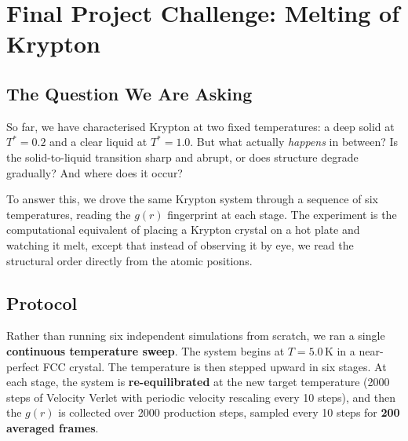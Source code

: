 %
%
\section{Final Project Challenge: Melting of Krypton}

\subsection{The Question We Are Asking}

So far, we have characterised Krypton at two fixed temperatures: a deep solid at $T^* = 0.2$ and a clear liquid at $T^* = 1.0$. But what actually \emph{happens} in between? Is the solid-to-liquid transition sharp and abrupt, or does structure degrade gradually? And where does it occur?

To answer this, we drove the same Krypton system through a sequence of six temperatures, reading the $g(r)$ fingerprint at each stage. The experiment is the computational equivalent of placing a Krypton crystal on a hot plate and watching it melt, except that instead of observing it by eye, we read the structural order directly from the atomic positions.

\subsection{Protocol}

Rather than running six independent simulations from scratch, we ran a single \textbf{continuous temperature sweep}. The system begins at $T = 5.0$\,K in a near-perfect FCC crystal. The temperature is then stepped upward in six stages. At each stage, the system is \textbf{re-equilibrated} at the new target temperature (2000 steps of Velocity Verlet with periodic velocity rescaling every 10 steps), and then the $g(r)$ is collected over 2000 production steps, sampled every 10 steps for \textbf{200 averaged frames}.


